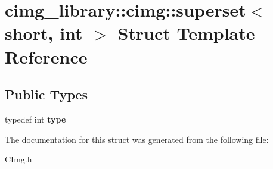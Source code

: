\hypertarget{structcimg__library_1_1cimg_1_1superset_3_01short_00_01int_01_4}{\section{cimg\-\_\-library\-:\-:cimg\-:\-:superset$<$ short, int $>$ Struct Template Reference}
\label{structcimg__library_1_1cimg_1_1superset_3_01short_00_01int_01_4}
}
\subsection*{Public Types}
\begin{DoxyCompactItemize}
\item 
\hypertarget{structcimg__library_1_1cimg_1_1superset_3_01short_00_01int_01_4_a7959d0e13f4c19f5a6b68c706a6f4526}{typedef int {\bfseries type}}\label{structcimg__library_1_1cimg_1_1superset_3_01short_00_01int_01_4_a7959d0e13f4c19f5a6b68c706a6f4526}

\end{DoxyCompactItemize}


The documentation for this struct was generated from the following file\-:\begin{DoxyCompactItemize}
\item 
C\-Img.\-h\end{DoxyCompactItemize}
